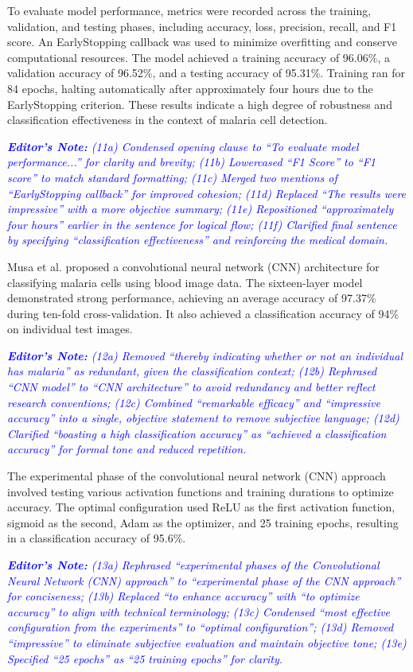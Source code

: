 \documentclass[journal,12pt,onecolumn,draftcls]{IEEEtran}
\newcommand{\editornote}[1]{\par\textit{\textcolor{blue}{\textbf{Editor's Note:} #1}}\par}
\begin{document}
To evaluate model performance, metrics were recorded across the training, validation, and testing phases, including accuracy, loss, precision, recall, and F1 score. An EarlyStopping callback was used to minimize overfitting and conserve computational resources. The model achieved a training accuracy of 96.06\%, a validation accuracy of 96.52\%, and a testing accuracy of 95.31\%. Training ran for 84 epochs, halting automatically after approximately four hours due to the EarlyStopping criterion. These results indicate a high degree of robustness and classification effectiveness in the context of malaria cell detection.

\editornote{(11a) Condensed opening clause to “To evaluate model performance...” for clarity and brevity; 
(11b) Lowercased “F1 Score” to “F1 score” to match standard formatting; 
(11c) Merged two mentions of “EarlyStopping callback” for improved cohesion; 
(11d) Replaced “The results were impressive” with a more objective summary; 
(11e) Repositioned “approximately four hours” earlier in the sentence for logical flow; 
(11f) Clarified final sentence by specifying “classification effectiveness” and reinforcing the medical domain.}

Musa et al. \cite{musa2022} proposed a convolutional neural network (CNN) architecture for classifying malaria cells using blood image data. The sixteen-layer model demonstrated strong performance, achieving an average accuracy of 97.37\% during ten-fold cross-validation. It also achieved a classification accuracy of 94\% on individual test images.

\editornote{(12a) Removed “thereby indicating whether or not an individual has malaria” as redundant, given the classification context; 
(12b) Rephrased “CNN model” to “CNN architecture” to avoid redundancy and better reflect research conventions; 
(12c) Combined “remarkable efficacy” and “impressive accuracy” into a single, objective statement to remove subjective language; 
(12d) Clarified “boasting a high classification accuracy” as “achieved a classification accuracy” for formal tone and reduced repetition.}

The experimental phase of the convolutional neural network (CNN) approach involved testing various activation functions and training durations to optimize accuracy. The optimal configuration used ReLU as the first activation function, sigmoid as the second, Adam as the optimizer, and 25 training epochs, resulting in a classification accuracy of 95.6\%.

\editornote{(13a) Rephrased “experimental phases of the Convolutional Neural Network (CNN) approach” to “experimental phase of the CNN approach” for conciseness; 
(13b) Replaced “to enhance accuracy” with “to optimize accuracy” to align with technical terminology; 
(13c) Condensed “most effective configuration from the experiments” to “optimal configuration”; 
(13d) Removed “impressive” to eliminate subjective evaluation and maintain objective tone; 
(13e) Specified “25 epochs” as “25 training epochs” for clarity.}
\end{document}
